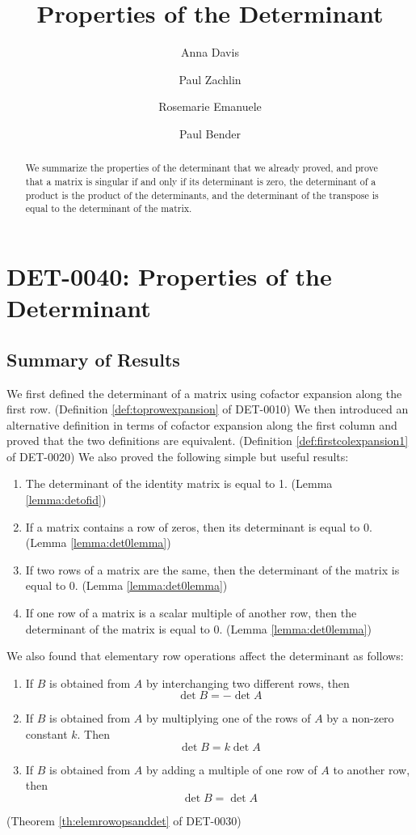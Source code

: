 \documentclass{ximera}
\author{Anna Davis \and Paul Zachlin \and Rosemarie Emanuele \and Paul Bender} \title{Properties of the Determinant} \license{CC-BY 4.0}
\begin{document}
\begin{abstract}
 We summarize the properties of the determinant that we already proved, and prove that a matrix is singular if and only if its determinant is zero, the determinant of a product is the product of the determinants, and the determinant of the transpose is equal to the determinant of the matrix.
\end{abstract}
\maketitle

\section*{DET-0040: Properties of the Determinant}
\subsection*{Summary of Results}
We first defined the determinant of a matrix using cofactor expansion along the first row. (Definition \ref{def:toprowexpansion} of DET-0010)  We then introduced an alternative definition in terms of cofactor expansion along the first column and proved that the two definitions are equivalent. (Definition \ref{def:firstcolexpansion1} of DET-0020)  We also proved the following simple but useful results:
\begin{enumerate}
\item The determinant of the identity matrix is equal to 1. (Lemma \ref{lemma:detofid})

\item If a matrix contains a row of zeros, then its determinant is equal to 0. (Lemma \ref{lemma:det0lemma})
\item If two rows of a matrix are the same, then the determinant of the matrix is equal to 0.  (Lemma \ref{lemma:det0lemma})
\item If one row of a matrix is a scalar multiple of another row, then the determinant of the matrix is equal to 0. (Lemma \ref{lemma:det0lemma})
\end{enumerate}
We also found that elementary row operations affect the determinant as follows:
\begin{enumerate}
\item
If $B$ is obtained from $A$ by interchanging two different rows, then $$\det{B}=-\det{A}$$
\item 
If $B$ is obtained from $A$ by multiplying one of the rows of $A$ by a non-zero constant $k$.  Then $$\det{B}=k\det{A}$$
\item 
If $B$ is obtained from $A$ by adding a multiple of one row of $A$ to another row, then
$$\det{B}=\det{A}$$
\end{enumerate}
(Theorem \ref{th:elemrowopsanddet} of DET-0030)
\end{document}

